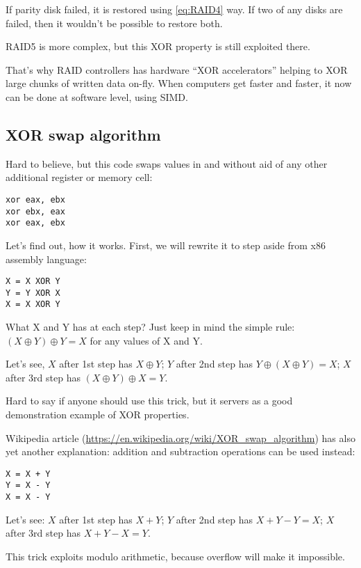 If parity disk failed, it is restored using \ref{eq:RAID4} way.
If two of any disks are failed, then it wouldn't be possible to restore both.

\ac{RAID}5 is more complex, but this XOR property is still exploited there.

That's why \ac{RAID} controllers has hardware ``XOR accelerators'' helping to XOR large chunks of written data on-fly.
When computers get faster and faster, it now can be done at software level, using \ac{SIMD}.

\subsection{XOR swap algorithm}

Hard to believe, but this code swaps values in \EAX and \EBX without aid of any other additional register or memory cell:

\begin{lstlisting}
xor eax, ebx
xor ebx, eax
xor eax, ebx
\end{lstlisting}

Let's find out, how it works.
First, we will rewrite it to step aside from x86 assembly language:

\begin{lstlisting}
X = X XOR Y
Y = Y XOR X
X = X XOR Y
\end{lstlisting}

What X and Y has at each step?
Just keep in mind the simple rule: $(X \oplus Y) \oplus Y = X$ for any values of X and Y.

Let's see,
$X$ after 1st step has $X \oplus Y$;
$Y$ after 2nd step has $Y \oplus (X \oplus Y) = X$;
$X$ after 3rd step has $(X \oplus Y) \oplus X = Y$.

Hard to say if anyone should use this trick, but it servers as a good demonstration example of XOR properties.

Wikipedia article (\url{https://en.wikipedia.org/wiki/XOR_swap_algorithm}) has also yet another explanation:
addition and subtraction operations can be used instead:

\begin{lstlisting}
X = X + Y
Y = X - Y
X = X - Y
\end{lstlisting}

Let's see:
$X$ after 1st step has $X+Y$;
$Y$ after 2nd step has $X+Y-Y=X$;
$X$ after 3rd step has $X+Y-X=Y$.

This trick exploits modulo arithmetic, because overflow will make it impossible.

